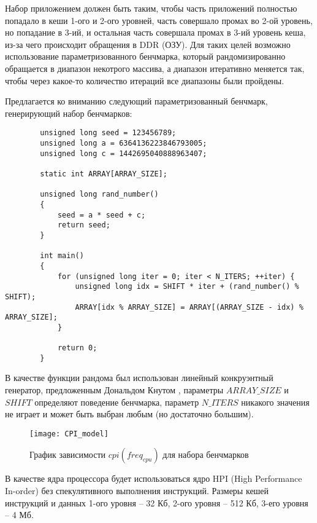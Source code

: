     Набор приложением должен быть таким, чтобы часть приложений полностью попадало в кеши 1-ого и 2-ого уровней,
    часть совершало промах во 2-ой уровень, но попадание в 3-ий, и остальная часть совершала промах в 3-ий уровень
    кеша, из-за чего происходит обращения в DDR (ОЗУ). Для таких целей возможно использование параметризованного
    бенчмарка, который рандомизированно обращается в диапазон некотрого массива, а диапазон итеративно меняется так,
    чтобы через какое-то количество итераций все диапазоны были пройдены.

    Предлагается ко вниманию следующий параметризованный бенчмарк, генерирующий набор бенчмарков:

    \begin{lstlisting}
        unsigned long seed = 123456789;
        unsigned long a = 6364136223846793005;
        unsigned long c = 1442695040888963407;

        static int ARRAY[ARRAY_SIZE];

        unsigned long rand_number()
        {
            seed = a * seed + c;
            return seed;
        }

        int main()
        {
            for (unsigned long iter = 0; iter < N_ITERS; ++iter) {
                unsigned long idx = SHIFT * iter + (rand_number() % SHIFT);
                ARRAY[idx % ARRAY_SIZE] = ARRAY[(ARRAY_SIZE - idx) % ARRAY_SIZE];
            }

            return 0;
        }
    \end{lstlisting}

    В качестве функции рандома был использован линейный конкруэнтный генератор, предложенным Дональдом Кнутом
    \cite{knuth1973art}, параметры $ARRAY\_SIZE$ и $SHIFT$ определяют поведение бенчмарка, параметр $N\_ITERS$
    никакого значения не играет и может быть выбран любым (но достаточно большим).

    \begin{figure}[!h]
        \caption{График зависимости $cpi(freq_{cpu})$ для набора бенчмарков}
        \centering
        \texttt{[image: CPI\_model]}
        \label{pic:cpi_model}
    \end{figure}

    В качестве ядра процессора будет использоваться ядро HPI (High Performance In-order)
    \cite{gem52017HPI} без спекулятивного выполнения инструкций. Размеры кешей инструкций и данных
    1-ого уровня -- 32 Кб, 2-ого уровня -- 512 Кб, 3-его уровня -- 4 Мб.


